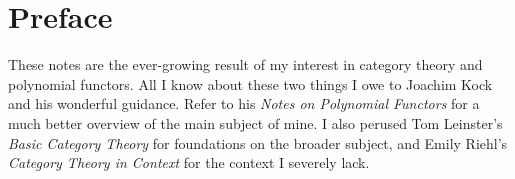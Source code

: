\section*{Preface}

These notes are the ever-growing result of my interest in category theory and polynomial functors. All I know about these two things I owe to Joachim Kock and his wonderful guidance. Refer to his \emph{Notes on Polynomial Functors} \cite{kock} for a much better overview of the main subject of mine. I also perused Tom Leinster's \emph{Basic Category Theory} \cite{leinster} for foundations on the broader subject, and Emily Riehl's \emph{Category Theory in Context} \cite{riehl} for the context I severely lack.
